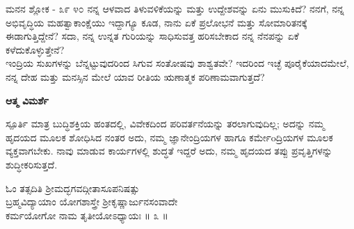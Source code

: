 \begin{mananam}{\mananamfont \large ಮನನ ಶ್ಲೋಕ - ೩೯ ೪೦}
\mananamtext ನನ್ನ ಆಳವಾದ ತಿಳುವಳಿಕೆಯನ್ನು ಮತ್ತು ಉದ್ದೇಶವನ್ನು ಏನು ಮುಸುಕಿದೆ? ನನಗೆ, ನನ್ನ ಅಭಿವೃದ್ಧಿಯ ಮಹತ್ವಾಕಾಂಕ್ಷೆಯು ಇದ್ದಾಗ್ಯೂ ಕೂಡ, ನಾನು ಏಕೆ ಪ್ರಲೋಭನೆ ಮತ್ತು ಸೋಮಾರಿತನಕ್ಕೆ ಈಡಾಗುತ್ತಿದ್ದೇನೆ? ಸದಾ, ನನ್ನ ಉನ್ನತ ಗುರಿಯನ್ನು ಸಾಧಿಸುವತ್ತ ಹರಿಸಬೇಕಾದ ನನ್ನ ನೆನಪನ್ನು ಏಕೆ ಕಳೆದುಕೊಳ್ಳುತ್ತೇನೆ?\\
ಇಂದ್ರಿಯ ಸುಖಗಳನ್ನು ಬೆನ್ನಟ್ಟುವುದರಿಂದ ಸಿಗುವ ಸಂತೋಷವು ಶಾಶ್ವತವೇ? ಇದರಿಂದ ಇಚ್ಛೆ ಪೂರೈಕೆಯಾದಮೇಲೆ, ನನ್ನ ದೇಹ ಮತ್ತು ಮನಸ್ಸಿನ ಮೇಲೆ ಯಾವ ರೀತಿಯ ಋಣಾತ್ಮಕ ಪರಿಣಾಮವಾಗುತ್ತದೆ? 
\end{mananam}
\WritingHand\enspace\textbf{ಆತ್ಮ ವಿಮರ್ಶೆ}\\
\begin{inspiration}{\mananamfont \large ಸ್ಪೂರ್ತಿ}
\mananamtext ಮಾತ್ರ ಬುದ್ಧಿಶಕ್ತಿಯ ಹಂತದಲ್ಲಿ, ವಿವೇಕದಿಂದ ಪರಿವರ್ತನೆಯನ್ನು ತರಲಾಗುವುದಿಲ್ಲ; ಅದನ್ನು ನಮ್ಮ ಹೃದಯದ ಮೂಲಕ ಶೋಧಿಸಿದ ನಂತರ ಅದು, ನಮ್ಮ ಜ್ಞಾನೇಂದ್ರಿಯಗಳ ಹಾಗೂ ಕರ್ಮೇoದ್ರಿಯಗಳ ಮೂಲಕ  ವ್ಯಕ್ತವಾಗಬೇಕು. ನಾವು ಮಾಡುವ ಕಾರ್ಯಗಳಲ್ಲಿ ಶುದ್ಧತೆ ಇದ್ದರೆ ಅದು, ನಮ್ಮ ಹೃದಯದ ತಪ್ಪು ಪ್ರವೃತ್ತಿಗಳನ್ನು ಶುದ್ಧೀಕರಿಸುತ್ತದೆ.
\end{inspiration}
\newpage

\begin{center}
ಓಂ ತತ್ಸದಿತಿ ಶ್ರೀಮದ್ಭಗವದ್ಗೀತಾಸೂಪನಿಷತ್ಸು \\ಬ್ರಹ್ಮವಿದ್ಯಾಯಾಂ ಯೋಗಶಾಸ್ತ್ರೇ ಶ್ರೀಕೃಷ್ಣಾರ್ಜುನಸಂವಾದೇ\\
ಕರ್ಮಯೋಗೋ ನಾಮ ತೃತೀಯೋಽಧ್ಯಾಯಃ ॥ ೩ ॥
\end{center}

